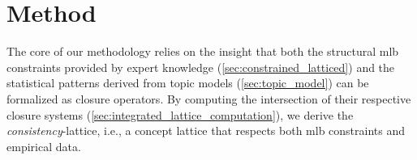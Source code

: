 



\section{Method}
\label{sec:method}

The core of our methodology relies on the insight that both the structural \ac{mlb} constraints provided by expert knowledge (\autoref{sec:constrained_latticed}) and the statistical patterns derived from topic models (\autoref{sec:topic_model}) can be formalized as closure operators. 
By computing the intersection of their respective closure systems (\autoref{sec:integrated_lattice_computation}), we derive the \textit{consistency}-lattice, i.e., a concept lattice that respects both \ac{mlb} constraints and empirical data.







% 
